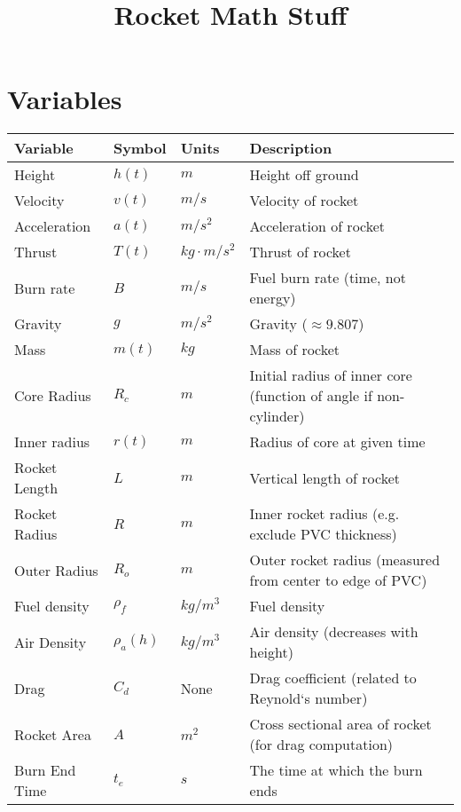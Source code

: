 \documentclass[12pt,a4paper]{article}
\title{Rocket Math Stuff}
\date{}
\begin{document}
\maketitle


\section{Variables}


\begin{tabular}{l | l | l | l}
    \textbf{Variable} & \textbf{Symbol} & \textbf{Units} & \textbf{Description} \\
    \hline
    Height          & $h(t)$      & $m$              & Height off ground \\
    Velocity        & $v(t)$      & $m/s$            & Velocity of rocket \\
    Acceleration    & $a(t)$      & $m/s^2$          & Acceleration of rocket \\
    Thrust          & $T(t)$      & $kg\cdot m/s^2$  & Thrust of rocket \\
    Burn rate       & $B$         & $m/s$            & Fuel burn rate (time, not energy) \\
    Gravity         & $g$         & $m/s^2$          & Gravity ($\approx 9.807$) \\
    Mass            & $m(t)$      & $kg$             & Mass of rocket \\
    Core Radius     & $R_c$       & $m$              & Initial radius of inner core (function of angle if non-cylinder) \\
    Inner radius    & $r(t)$      & $m$              & Radius of core at given time \\
    Rocket Length   & $L$         & $m$              & Vertical length of rocket \\
    Rocket Radius   & $R$         & $m$              & Inner rocket radius (e.g. exclude PVC thickness) \\
    Outer Radius    & $R_o$       & $m$              & Outer rocket radius (measured from center to edge of PVC) \\
    Fuel density    & $\rho_f$    & $kg/m^3$         & Fuel density \\
    Air Density     & $\rho_a(h)$ & $kg/m^3$         & Air density (decreases with height) \\
    Drag            & $C_d$       & None             & Drag coefficient (related to Reynold‘s number) \\
    Rocket Area     & $A$         & $m^2$            & Cross sectional area of rocket (for drag computation) \\
    Burn End Time   & $t_e$       & $s$              & The time at which the burn ends
\end{tabular}
\end{document}
